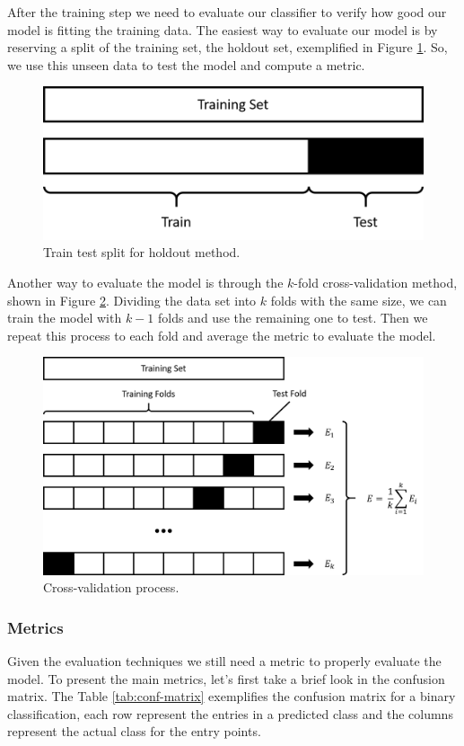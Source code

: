 	After the training step we need to evaluate our classifier to verify how good our model is fitting the training data. The easiest way to evaluate our model is by reserving a split of the training set, the holdout set, exemplified in Figure \ref{fig:holdout-evaluate}. So, we use this unseen data to test the model and compute a metric.
	
	\begin{figure}[h!]
		\centering
		\includegraphics[width=0.4\linewidth]{01.Chapters/02.Background/holdout-evaluate}
		\caption{Train test split for holdout method.}
		\label{fig:holdout-evaluate}
	\end{figure}

	Another way to evaluate the model is through the $k$-fold cross-validation method, shown in Figure \ref{fig:cross-validate}. Dividing the data set into $k$ folds with the same size, we can train the model with $k-1$ folds and use the remaining one to test. Then we repeat this process to each fold and average the metric to evaluate the model.

	\begin{figure}[h!]
		\centering
		\includegraphics[width=0.55\linewidth]{01.Chapters/02.Background/cross-validate}
		\caption{Cross-validation process.}
		\label{fig:cross-validate}
	\end{figure}
	
	\subsubsection{Metrics}
	\label{sub-sub:metrics}

	Given the evaluation techniques we still need a metric to properly evaluate the model. To present the main metrics, let's first take a brief look in the confusion matrix. The Table \ref{tab:conf-matrix} exemplifies the confusion matrix for a binary classification, each row represent the entries in a predicted class and the columns represent the actual class for the entry points.
	
